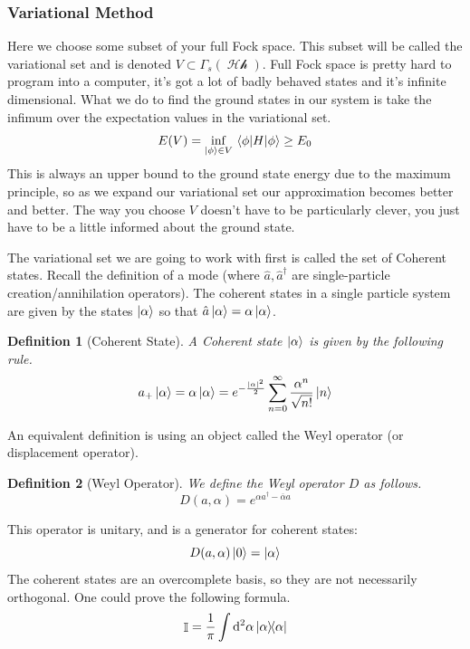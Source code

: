 \documentclass{article}
\DeclareMathOperator{\Hh}{\mathcal{Hh}}
\DeclareMathOperator{\II}{\mathbb{I}}
\newtheorem{defn}{Definition}
\begin{document}
\subsubsection{Variational Method}
Here we choose some subset of your full Fock space. This subset will be called the variational set and is denoted $V \subset \Gamma_s(\Hh)$. Full Fock space is pretty hard to program into a computer, it's got a lot of badly behaved states and it's infinite dimensional. What we do to find the ground states in our system is take the infimum over the expectation values in the variational set.
\begin{equation}
E(V) = \inf_{\ket{\phi}\in V}\expval{H}{\phi} \geq E_0
\end{equation}
This is always an upper bound to the ground state energy due to the maximum principle, so as we expand our variational set our approximation becomes better and better. The way you choose $V$ doesn't have to be particularly clever, you just have to be a little informed about the ground state.

The variational set we are going to work with first is called the set of Coherent states. Recall the definition of a mode (where $\hat a, \hat a^\dagger$ are single-particle creation/annihilation operators). The coherent states in a single particle system are given by the states $\ket{\alpha}$ so that $\hat a\ket{\alpha} = \alpha\ket{\alpha}$.

\begin{defn}[Coherent State] A Coherent state $\ket{\alpha}$ is given by the following rule.
\begin{equation}
a_+\ket{\alpha} = \alpha\ket{\alpha} = e^{-\frac{|\alpha|^2}{2}}\sum_{n=0}^\infty\frac{\alpha^n}{\sqrt{n!}}\ket{n}
\end{equation}
\end{defn}
An equivalent definition is using an object called the Weyl operator (or displacement operator).
\begin{defn}[Weyl Operator] We define the Weyl operator $D$ as follows.
\begin{equation}D(a,\alpha) = e^{\alpha a^\dagger - \overline\alpha a}\end{equation}
\end{defn}
This operator is unitary, and is a generator for coherent states:
\[D(a,\alpha)\ket{0} = \ket{\alpha}\]
The coherent states are an overcomplete basis, so they are not necessarily orthogonal. One could prove the following formula.
\[\II=\frac{1}{\pi}\int \dd^2 \alpha \dyad{\alpha}\]
\end{document}
